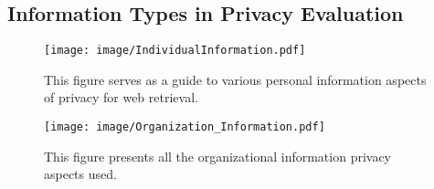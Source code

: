 \newpage
\subsection{Information Types in Privacy Evaluation}

\begin{figure}[H]
    \centering
    \texttt{[image: image/IndividualInformation.pdf]}
    \caption{This figure serves as a guide to various personal information aspects of privacy for web retrieval.}
    \label{fig:enter-label}
\end{figure}

\begin{figure}[]
    \centering
    \texttt{[image: image/Organization\_Information.pdf]}
    \caption{This figure presents all the organizational information privacy aspects used.}
    \label{fig:enter-label}
\end{figure}
\nopagebreak


